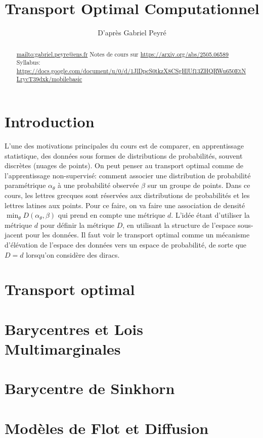 \documentclass[info, math, french]{mpb-cours}
\title{Transport Optimal Computationnel}
\author{D'après Gabriel Peyré}
\begin{document}
\bettertitle
\begin{abstract}
	\url{mailto:gabriel.peyre@ens.fr}
	Notes de cours sur \url{https://arxiv.org/abs/2505.06589}
	Syllabus: \url{https://docs.google.com/document/u/0/d/1JlDpcS0tkzX8CSgHlUf13ZHQRWu650EtNLrycT39dxk/mobilebasic}
\end{abstract}

\section*{Introduction}
L'une des motivations principales du cours est de comparer, en apprentissage statistique,
des données sous formes de distributions de probabilités, souvent discrètes (nuages de points).
On peut penser au transport optimal comme de l'apprentissage non-supervisé: comment associer une
distribution de probabilité paramétrique $\alpha_{\theta}$ à une probabilité observée $\beta$ sur un groupe de points.
Dans ce cours, les lettres grecques sont réservées aux distributions de probabilités et les lettres latines
aux points.
Pour ce faire, on va faire une association de densité $\min_{\theta} D(\alpha_{\theta}, \beta)$ qui
prend en compte une métrique $d$.
L'idée étant d'utiliser la métrique $d$ pour définir la métrique $D$, en utilisant la structure
de l'espace sous-jacent pour les données.
Il faut voir le transport optimal comme un mécanisme d'élévation de l'espace des données vers un espace
de probabilité, de sorte que $D = d$ lorsqu'on considère des diracs.









\section{Transport optimal}

\section{Barycentres et Lois Multimarginales}

\section{Barycentre de Sinkhorn}

\section{Modèles de Flot et Diffusion}
\end{document}
